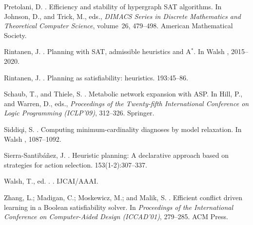 \begin{thebibliography}{}
Pretolani, D.
.
\newblock Efficiency and stability of hypergraph {SAT} algorithms.
\newblock In Johnson, D., and Trick, M., eds., {\em DIMACS Series in Discrete
  Mathematics and Theoretical Computer Science}, volume~26,  479--498.
\newblock American Mathematical Society.

Rintanen, J.
.
\newblock Planning with {SAT}, admissible heuristics and {A}$^*$.
\newblock In Walsh ,  2015--2020.

Rintanen, J.
.
\newblock Planning as satisfiability: heuristics.
 193:45--86.

Schaub, T., and Thiele, S.
.
\newblock Metabolic network expansion with {ASP}.
\newblock In Hill, P., and Warren, D., eds., {\em Proceedings of the
  Twenty-fifth International Conference on Logic Programming (ICLP'09)},  312--326.
\newblock Springer.

Siddiqi, S.
.
\newblock Computing minimum-cardinality diagnoses by model relaxation.
\newblock In Walsh ,  1087--1092.

Sierra-Santib{\'a}{\~n}ez, J.
.
\newblock Heuristic planning: A declarative approach based on strategies for
  action selection.
 153(1-2):307--337.

Walsh, T., ed.
.
. IJCAI/AAAI.

Zhang, L.; Madigan, C.; Moskewicz, M.; and Malik, S.
.
\newblock Efficient conflict driven learning in a {B}oolean satisfiability
  solver.
\newblock In {\em Proceedings of the International Conference on Computer-Aided
  Design (ICCAD'01)},  279--285.
\newblock ACM Press.

\end{thebibliography}

